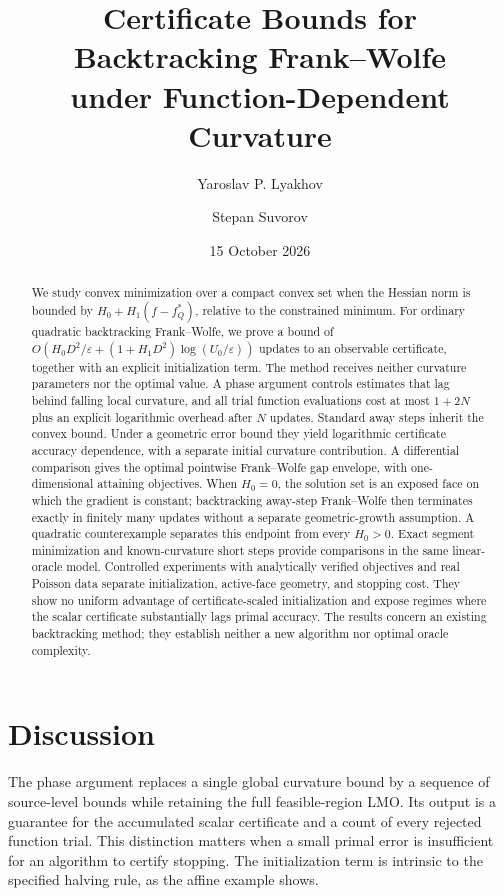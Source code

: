 \documentclass[a4paper,11pt]{article}
\title{Certificate Bounds for Backtracking Frank--Wolfe\\under Function-Dependent Curvature}
\author{Yaroslav P. Lyakhov \and Stepan Suvorov}
\date{15 October 2026}
\begin{document}
\maketitle
\begin{abstract}
We study convex minimization over a compact convex set when the Hessian
norm is bounded by $H_0+H_1(f-f_Q^*)$, relative to the constrained minimum.
For ordinary quadratic backtracking Frank--Wolfe, we prove a bound of
$O(H_0D^2/\varepsilon+(1+H_1D^2)\log(U_0/\varepsilon))$ updates to an
observable certificate, together with an explicit initialization term.
The method receives neither curvature parameters nor the optimal value.
A phase argument controls estimates that lag behind falling local
curvature, and all trial function evaluations cost at most $1+2N$ plus
an explicit logarithmic overhead after $N$ updates. Standard away steps
inherit the convex bound. Under a geometric error bound they yield
logarithmic certificate accuracy dependence, with a separate initial
curvature contribution. A differential comparison gives the optimal
pointwise Frank--Wolfe gap envelope, with one-dimensional attaining
objectives. When $H_0=0$, the solution set is an exposed face on which
the gradient is constant; backtracking away-step Frank--Wolfe then
terminates exactly in finitely many updates without a separate
geometric-growth assumption. A quadratic counterexample separates
this endpoint from every $H_0>0$.
Exact segment minimization and known-curvature
short steps provide comparisons in the same linear-oracle model.
Controlled experiments with analytically verified objectives and real
Poisson data separate initialization, active-face geometry, and stopping
cost. They show no uniform advantage of certificate-scaled initialization
and expose regimes where the scalar certificate substantially lags
primal accuracy. The results concern an existing backtracking method;
they establish neither a new algorithm nor optimal oracle complexity.
\end{abstract}







\section{Discussion}
The phase argument replaces a single global curvature bound by a sequence
of source-level bounds while retaining the full feasible-region LMO.
Its output is a guarantee for the accumulated scalar certificate and a
count of every rejected function trial. This distinction matters when a
small primal error is insufficient for an algorithm to certify stopping.
The initialization term is intrinsic to the specified halving rule,
as the affine example shows.
\end{document}
